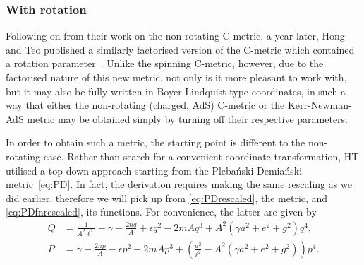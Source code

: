 \documentclass[
twoside,
openright,
frontopenright,
]{dmathesis}
\newcommand{\nn}{\nonumber}
\newcommand{\PD}{Pleba\'nski-Demia\'nski}
\begin{document}
\subsubsection{With rotation}
Following on from their work on the non-rotating C-metric, a year later, Hong
and Teo published a similarly factorised version of the C-metric which contained
a rotation parameter~\cite{Hong:2004dm}. Unlike the spinning C-metric, however,
due to the factorised nature of this new metric, not only is it more pleasant to
work with, but it may also be fully written in Boyer-Lindquist-type coordinates,
in such a way that either the non-rotating (charged, AdS) C-metric or the
Kerr-Newman-AdS metric may be obtained simply by turning off their respective
parameters.

In order to obtain such a metric, the starting point is different to the
non-rotating case. Rather than search for a convenient coordinate
transformation, HT utilised a top-down approach starting from the \PD{}
metric~\eqref{eq:PD}. In fact, the derivation requires making the same rescaling
as we did earlier, therefore we will pick up from \cref{eq:PDrescaled}, the
metric, and \cref{eq:PDfnrescaled}, its functions. For convenience, the latter
are given by
\begin{align}
  Q &= \frac{1}{A^2\ell^2} - \gamma - \frac{2nq}{A} + \epsilon q^2 -
      2mAq^3 + A^2\left(\gamma a^2 + e^2 + g^2\right)q^4,\nn\\
  P &=  \gamma - \frac{2np}{A} - \epsilon p^2 -
      2mAp^3 + \left(\frac{a^2}{\ell^2} - A^2(\gamma a^2+e^2+g^2)\right)p^4.
\end{align}
\end{document}
